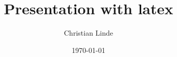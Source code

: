 
 \newcommand{\TITEL}{Presentation with latex} 
 \title{\TITEL}
 \newcommand{\AuthorA}{Christian Linde}
 \newcommand{\AuthorB}{\AuthorA}
 \newcommand{\Author}{\AuthorA}
 \author{\Author}

 \date{\today} 

\newcommand{\para}{\parindent 0pt \parskip 12pt}
